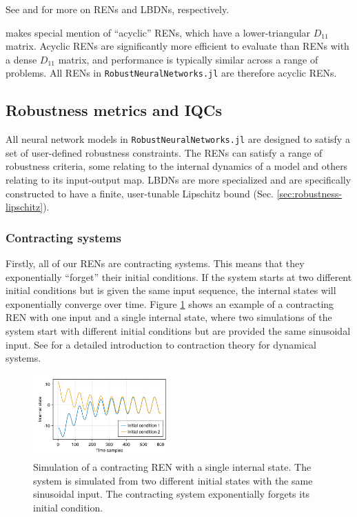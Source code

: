 See \cite{Revay++2023} and \cite{Wang+Manchester2023} for more on RENs and LBDNs, respectively.

\begin{remark}
	\cite{Revay++2023} makes special mention of ``acyclic'' RENs, which have a lower-triangular $D_{11}$ matrix. Acyclic RENs are significantly more efficient to evaluate than RENs with a dense $D_{11}$ matrix, and performance is typically similar across a range of problems. All RENs in \verb|RobustNeuralNetworks.jl| are therefore acyclic RENs.
\end{remark}

\subsection{Robustness metrics and IQCs} \label{sec:robustness}

All neural network models in \verb|RobustNeuralNetworks.jl| are designed to satisfy a set of user-defined robustness constraints. The RENs can satisfy a range of robustness criteria, some relating to the internal dynamics of a model and others relating to its input-output map. LBDNs are more specialized and are specifically constructed to have a finite, user-tunable Lipschitz bound (Sec. \ref{sec:robustness-lipschitz}).

\subsubsection{Contracting systems} \label{sec:robustness-contraction}

Firstly, all of our RENs are contracting systems. This means that they exponentially ``forget'' their initial conditions. If the system starts at two different initial conditions but is given the same input sequence, the internal states will exponentially converge over time. Figure \ref{fig:contracting-ren} shows an example of a contracting REN with one input and a single internal state, where two simulations of the system start with different initial conditions but are provided the same sinusoidal input. See \cite{Bullo2022} for a detailed introduction to contraction theory for dynamical systems.

\begin{figure}[ht]
    \centering
    \includegraphics[width=0.47\textwidth]{Images/contracting_ren.pdf}
    \caption{Simulation of a contracting REN with a single internal state. The system is simulated from two different initial states with the same sinusoidal input. The contracting system exponentially forgets its initial condition.}
    \label{fig:contracting-ren}
\end{figure}

